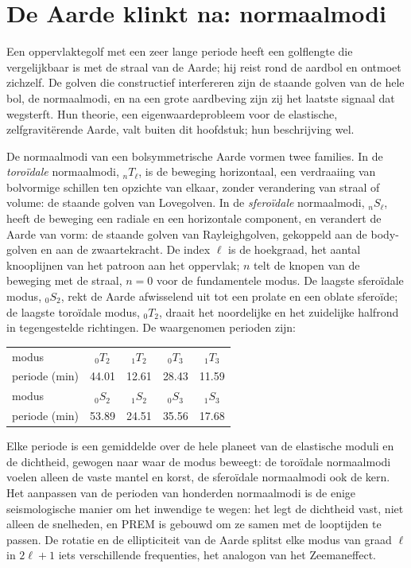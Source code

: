 \section{De Aarde klinkt na: normaalmodi}

Een oppervlaktegolf met een zeer lange periode heeft een golflengte die vergelijkbaar is met de
straal van de Aarde; hij reist rond de aardbol en ontmoet zichzelf.
De golven die constructief interfereren zijn de staande golven van de hele bol, de
normaalmodi, en na een grote aardbeving zijn zij het laatste signaal dat wegsterft.
Hun theorie, een eigenwaardeprobleem voor de elastische, zelfgravitërende Aarde, valt
buiten dit hoofdstuk; hun beschrijving wel.

De normaalmodi van een bolsymmetrische Aarde vormen twee families. In de
\emph{toroïdale} normaalmodi, ${}_nT_\ell$, is de beweging horizontaal, een verdraaiing van
bolvormige schillen ten opzichte van elkaar, zonder verandering van straal of volume: de
staande golven van Lovegolven. In de \emph{sferoïdale} normaalmodi, ${}_nS_\ell$,
heeft de beweging een radiale en een horizontale component, en verandert de Aarde van vorm: de
staande golven van Rayleighgolven, gekoppeld aan de body-golven en aan de zwaartekracht.
De index $\ell$ is de hoekgraad, het aantal knooplijnen van het
patroon aan het oppervlak; $n$ telt de knopen van de beweging met de straal, $n = 0$
voor de fundamentele modus. De laagste sferoïdale modus, ${}_0S_2$, rekt de
Aarde afwisselend uit tot een prolate en een oblate sferoïde; de laagste toroïdale
modus, ${}_0T_2$, draait het noordelijke en het zuidelijke halfrond in tegengestelde
richtingen. De waargenomen perioden zijn:
\begin{center}
\small
\begin{tabular}{lcccc}
\hline
modus & ${}_0T_2$ & ${}_1T_2$ & ${}_0T_3$ & ${}_1T_3$ \\
periode (\unit{min}) & 44.01 & 12.61 & 28.43 & 11.59 \\
\hline
modus & ${}_0S_2$ & ${}_1S_2$ & ${}_0S_3$ & ${}_1S_3$ \\
periode (\unit{min}) & 53.89 & 24.51 & 35.56 & 17.68 \\
\hline
\end{tabular}
\end{center}
Elke periode is een gemiddelde over de hele planeet van de elastische moduli en
de dichtheid, gewogen naar waar de modus beweegt: de toroïdale normaalmodi voelen alleen de
vaste mantel en korst, de sferoïdale normaalmodi ook de kern. Het aanpassen van de
perioden van honderden normaalmodi is de enige seismologische manier om het
inwendige te wegen: het legt de dichtheid vast, niet alleen de snelheden, en PREM is gebouwd om
ze samen met de looptijden te passen. De rotatie en de ellipticiteit van
de Aarde splitst elke modus van graad $\ell$ in $2\ell + 1$ iets verschillende
frequenties, het analogon van het Zeemaneffect.

